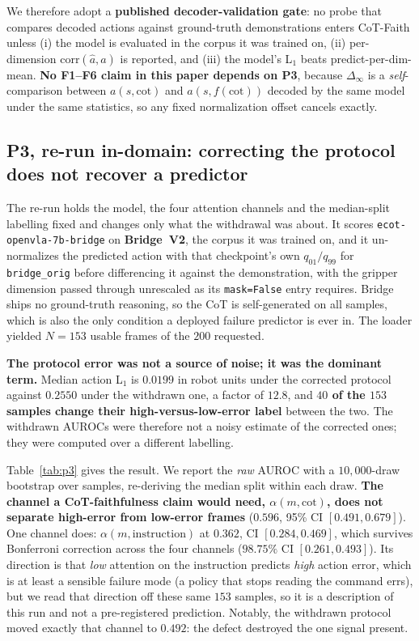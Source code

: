\documentclass{article}
\begin{document}
We therefore adopt a \textbf{published decoder-validation gate}: no probe that compares decoded actions against ground-truth demonstrations enters CoT-Faith unless (i) the model is evaluated in the corpus it was trained on, (ii) per-dimension $\mathrm{corr}(\hat a, a)$ is reported, and (iii) the model's L$_1$ beats predict-per-dim-mean. \textbf{No F1--F6 claim in this paper depends on P3}, because $\Delta_\infty$ is a \emph{self}-comparison between $a(s,\text{cot})$ and $a(s,f(\text{cot}))$ decoded by the same model under the same statistics, so any fixed normalization offset cancels exactly.

\subsection{P3, re-run in-domain: correcting the protocol does not recover a predictor}
\label{sec:p3_indomain}
The re-run holds the model, the four attention channels and the median-split labelling fixed and changes only what the withdrawal was about. It scores \texttt{ecot-openvla-7b-bridge} on \textbf{Bridge~V2}, the corpus it was trained on, and it un-normalizes the predicted action with that checkpoint's own $q_{01}/q_{99}$ for \texttt{bridge\_orig} before differencing it against the demonstration, with the gripper dimension passed through unrescaled as its \texttt{mask=False} entry requires. Bridge ships no ground-truth reasoning, so the CoT is self-generated on all samples, which is also the only condition a deployed failure predictor is ever in. The loader yielded $N{=}153$ usable frames of the $200$ requested.

\textbf{The protocol error was not a source of noise; it was the dominant term.} Median action L$_1$ is $0.0199$ in robot units under the corrected protocol against $0.2550$ under the withdrawn one, a factor of $12.8$, and \textbf{$40$ of the $153$ samples change their high-versus-low-error label} between the two. The withdrawn AUROCs were therefore not a noisy estimate of the corrected ones; they were computed over a different labelling.

Table~\ref{tab:p3} gives the result. We report the \emph{raw} AUROC with a $10{,}000$-draw bootstrap over samples, re-deriving the median split within each draw. \textbf{The channel a CoT-faithfulness claim would need, $\alpha(m,\text{cot})$, does not separate high-error from low-error frames} ($0.596$, 95\% CI $[0.491, 0.679]$). One channel does: $\alpha(m,\text{instruction})$ at $0.362$, CI $[0.284, 0.469]$, which survives Bonferroni correction across the four channels ($98.75\%$ CI $[0.261, 0.493]$). Its direction is that \emph{low} attention on the instruction predicts \emph{high} action error, which is at least a sensible failure mode (a policy that stops reading the command errs), but we read that direction off these same $153$ samples, so it is a description of this run and not a pre-registered prediction. Notably, the withdrawn protocol moved exactly that channel to $0.492$: the defect destroyed the one signal present.
\end{document}
